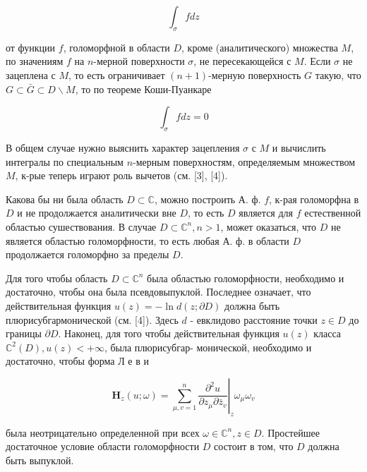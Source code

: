 \documentclass[10pt]{article}
\begin{document}
\[

\int_{\sigma} f d z

\]



от функции $f$, голоморфной в области $D$, кроме (аналитического) множества $M$, по значениям $f$ на $n$-мерной поверхности $\sigma$, не пересекающейся с $M$. Если $\sigma$ не зацеплена с $M$, то есть ограничивает $(n+1)$-мерную поверхность $G$ такую, что $G \subset \bar{G} \subset D \backslash M$, то по теореме Коши-Пуанкаре



\[

\int_{\sigma} f d z=0

\]



В общем случае нужно выяснить характер зацепления $\sigma$ с $M$ и вычислить интегралы по специальным $n$-мерным поверхностям, определяемым множеством $M$, к-рые теперь играют роль вычетов (см. [3], [4]).



Какова бы ни была область $D \subset \mathbb{C}$, можно построить А. ф. $f$, к-рая голоморфна в $D$ и не продолжается аналитически вне $D$, то есть $D$ является для $f$ естественной областью сушествования. В случае $D \subset \mathbb{C}^{n}, n>1$, может оказаться, что $D$ не является областью голоморфности, то есть любая А. ф. в области $D$ продолжается голоморфно за пределы $D$.



Для того чтобы область $D \subset \mathbb{C}^{n}$ была областью голоморфности, необходимо и достаточно, чтобы она была псевдовыпуклой. Последнее означает, что действительная функция $u(z)=-\ln d(z ; \partial D)$ должна быть плюрисубгармонической (см. [4]). Здесь $d$ - евклидово расстояние точки $z \in D$ до границы $\partial D$. Наконец, для того чтобы действительная функция $u(z)$ класса $\mathbb{C}^{2}(D), u(z)<+\infty$, была плюрисубгар- монической, необходимо и достаточно, чтобы форма Л е в и



\[

\boldsymbol{H}_{z}(u ; \omega)=\left.\sum_{\mu, v=1}^{n} \frac{\partial^{2} u}{\partial z_{\mu} \partial \bar{z}_{v}}\right|_{z} \omega_{\mu} \omega_{v}

\]



была неотрицательно определенной при всех $\omega \in \mathbb{C}^{n}, z \in D$. Простейшее достаточное условие области голоморфности $D$ состоит в том, что $D$ должна быть выпуклой.
\end{document}
